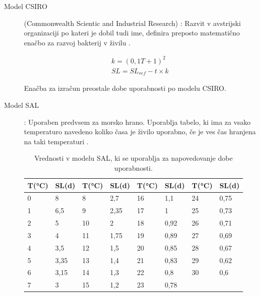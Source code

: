 \documentclass[a4paper, 12pt]{book}
\begin{document}
\begin{description}

	\item[Model CSIRO] (Commonwealth Scientic and Industrial Research) : Razvit v avstrijski organizaciji po kateri je dobil tudi ime, definira preposto matematično enačbo za razvoj bakterij v živilu \cite{CSIRO-organizacija}.
	
	\begin{align}
		k = (0,1T + 1)^2				\nonumber \\
       	SL = SL_{ref} - t \times k		\nonumber
	\end{align}
	
	Enačba za izračun preostale dobe uporabnosti po modelu CSIRO.
	
	\item[Model SAL] : Uporaben predvsem za morsko hrano. Uporablja tabelo, ki ima za vsako temperaturo navedeno koliko časa je živilo uporabno, če je ves čas hranjena na taki temperaturi \cite{magistrska-marolt}. 

\begin{table}[h]
\begin{center}
\begin{tabular}{ll|ll|ll|ll}
T(°C) & SL(d) & T(°C) & SL(d) & T(°C) & SL(d) & T(°C) & SL(d) \\ \hline
0     & 8     & 8     & 2,7   & 16    & 1,1   & 24    & 0,75  \\
1     & 6,5   & 9     & 2,35  & 17    & 1     & 25    & 0,73  \\
2     & 5     & 10    & 2     & 18    & 0,92  & 26    & 0,71  \\
3     & 4     & 11    & 1,75  & 19    & 0,89  & 27    & 0,69  \\
4     & 3,5   & 12    & 1,5   & 20    & 0,85  & 28    & 0,67  \\
5     & 3,35  & 13    & 1,4   & 21    & 0,83  & 29    & 0,62  \\
6     & 3,15  & 14    & 1,3   & 22    & 0,8   & 30    & 0,6   \\
7     & 3     & 15    & 1,2   & 23    & 0,78  &       &      
\end{tabular}
\caption{Vrednosti v modelu SAL, ki se uporablja za napovedovanje dobe uporabnosti.}
\label{tab:tabela-sal}
\end{center}
\end{table}
	
\end{description}
\end{document}
